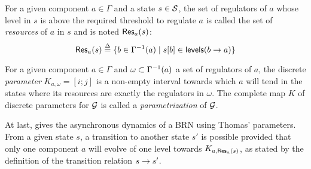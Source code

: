 \begin{definition}\label{def:resources}
For a given component $a \in \Gamma$ and a state $s \in \mathcal{S}$,
the set of regulators of $a$ whose level in $s$ is above the required threshold to regulate $a$
is called the set of \emph{resources} of $a$ in $s$ and is noted $\mathsf{Res}_{a}(s)$:
$$\mathsf{Res}_{a}(s) \stackrel{\Delta}= \{ b \in \Gamma^{-1}(a) \mid {s[b]} \in \mathsf{levels}(b\rightarrow a) \}$$
\end{definition}

\begin{definition}\label{def:param}
For a given component $a \in \Gamma$ and $\omega \subset \Gamma^{-1}(a)$ a set of regulators of $a$,
the discrete \emph{parameter} $K_{a,\omega} = [i; j]$ is a non-empty interval towards which $a$ will tend
in the states where its resources are exactly the regulators in $\omega$.
The complete map $K$ of discrete parameters for $\mathcal{G}$ is called a \emph{parametrization} of $\mathcal{G}$.
\end{definition}


At last,  gives the asynchronous dynamics of a BRN using Thomas' parameters.
From a given state $s$, a transition to another state $s'$ is possible provided that only one component $a$ will evolve of one level towards $K_{a,\mathsf{Res}_{a}(s)}$,
as stated by the definition of the transition relation $s \rightarrow s'$.
%

